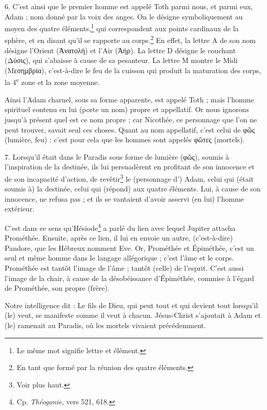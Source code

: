 \documentclass[landscape, a4paper, 11pt, oneside, polutonikogreek, french]{article}
\begin{document}
6. C'est ainsi que le premier homme est appelé Toth parmi nous, et parmi eux, Adam ; nom donné par la voix des anges. On le désigne symboliquement au moyen des quatre éléments,\footnote{Le même mot signifie lettre et élément.} qui correspondent aux points cardinaux de la sphère, et en disant qu'il se rapporte au corps.\footnote{En tant que formé par la réunion des quatre éléments.} En effet, la lettre A de son nom désigne l'Orient (Ἀνατολή) et l'Air (Ἀήρ). La lettre D désigne le couchant (Δύσις), qui s'abaisse à cause de sa pesanteur. La lettre M montre le Midi (Μεσημβρία), c'est-à-dire le feu de la cuisson qui produit la maturation des corps, la 4\textsuperscript{e} zone et la zone moyenne.

Ainsi l'Adam charnel, sous sa forme apparente, est appelé Toth ; mais l'homme spirituel contenu en lui (porte un nom) propre et appellatif. Or nous ignorons jusqu'à présent quel est ce nom propre ; car Nicothée, ce personnage que l'on ne peut trouver, savait seul ces choses. Quant au nom appellatif, c'est celui de φῶς (lumière, feu) : c'est pour cela que les hommes sont appelés φῶτες (mortels).

7. Lorsqu'il était dans le Paradis sous forme de lumière (φῶς), soumis à l'inspiration de la destinée, ils lui persuadèrent en profitant de son innocence et de son incapacité d'action, de revêtir\footnote{Voir plus haut.} le (personnage d') Adam, celui qui (était soumis à) la destinée, celui qui (répond) aux quatre éléments. Lui, à cause de son innocence, ne refusa pas ; et ils se vantaient d'avoir asservi (en lui) l'homme extérieur.

C'est dans ce sens qu'Hésiode\footnote{Cp. \emph{Théogonie}, vers 521, 618.} a parlé du lien avec lequel Jupiter attacha Prométhée. Ensuite, après ce lien, il lui en envoie un autre, (c'est-à-dire) Pandore, que les Hébreux nomment Eve. Or, Prométhée et Épiméthée, c'est un seul et même homme dans le langage allégorique ; c'est l'âme et le corps. Prométhée est tantôt l'image de l'âme ; tantôt (celle) de l'esprit. C'est aussi l'image de la chair, à cause de la désobéissance d'Épiméthée, commise à l'égard de Prométhée, son propre (frère).

Notre intelligence dit : Le fils de Dieu, qui peut tout et qui devient tout lorsqu'il (le) veut, se manifeste comme il veut à chacun. Jésus-Christ s'ajoutait à Adam et (le) ramenait au Paradis, où les mortels vivaient précédemment.
\end{document}
